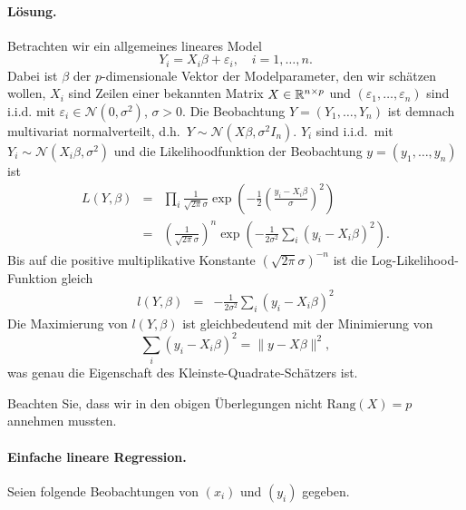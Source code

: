 \paragraph*{Lösung. } Betrachten wir ein allgemeines lineares Model
\begin{equation*}
    Y_i =  X_i \beta+ \varepsilon_i, \quad i=1,\ldots,n.
\end{equation*}
Dabei ist $\beta$ der $p$-dimensionale Vektor der Modelparameter, den wir schätzen wollen,
$X_i$ sind Zeilen einer bekannten Matrix $X\in\mathbb R^{n\times p}$ und 
$\left( \varepsilon_1, \ldots, \varepsilon_n \right)$ sind i.i.d. mit 
$\varepsilon_i \in\mathcal N(0,\sigma^2)$, $\sigma>0$. Die Beobachtung
$Y=\left( Y_1,\ldots,Y_n \right)$ ist demnach multivariat normalverteilt, d.h.\ 
$Y\sim\mathcal N(X\beta,\sigma^2 I_n)$. $Y_i$ sind i.i.d.\ mit
$Y_i\sim\mathcal N(X_i \beta, \sigma^2 )$ und die Likelihoodfunktion der Beobachtung 
$y=\left( y_1,\ldots, y_n \right)$ ist 
\begin{eqnarray*}
    L(Y, \beta) &=&  \prod_i \frac{1}{ \sqrt{2\pi} \sigma} 
    \exp\left( - \frac{1}{2} \left( \frac{y_i - X_i \beta }{\sigma}  \right)^2 \right) \\
    &=& \left( \frac{1}{\sqrt{2\pi}\sigma} \right)^n 
    \exp \left( -\frac{1}{2 \sigma^2} \sum_{i}^{} \left( y_i - X_i\beta \right)^2 \right).
\end{eqnarray*}
Bis auf die positive multiplikative Konstante $\left( \sqrt{2 \pi}\sigma \right)^{-n}$ ist 
die Log-Likelihood-Funktion gleich
\begin{eqnarray*}
    l(Y, \beta) &=& -\frac{1}{2 \sigma^2}  \sum_{i}^{} \left( y_i - X_i \beta \right)^2 
\end{eqnarray*}
Die Maximierung von $l(Y, \beta)$ ist gleichbedeutend mit der Minimierung von 
\begin{equation*}
    \sum_{i}^{} \left( y_i - X_i \beta \right)^2 = \| y - X \beta \|^2, 
\end{equation*}
was genau die Eigenschaft des Kleinste-Quadrate-Schätzers ist. 

Beachten Sie, dass wir in den obigen Überlegungen nicht
$\textrm{Rang}\left( X \right)=p$ annehmen mussten.






\paragraph{Einfache lineare Regression. } Seien folgende Beobachtungen von
$(x_i)$ und $(y_i)$ 
gegeben.

